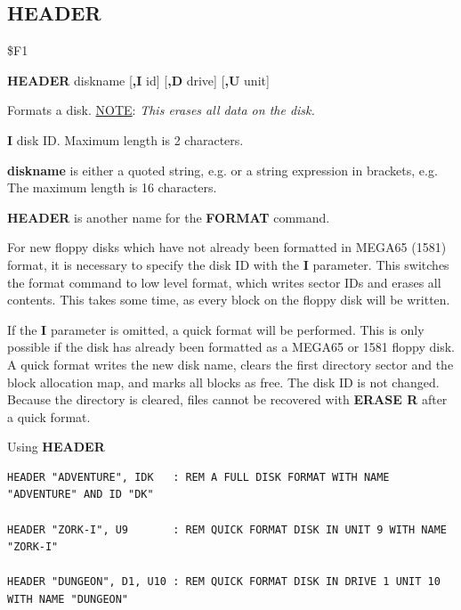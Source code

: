\subsection{HEADER}
\begin{description}[leftmargin=2cm,style=nextline]
\item [Token:]    \$F1

\item [Format:]   {\bf HEADER} diskname [{\bf,I} id] [{\bf,D} drive] [{\bf,U} unit]

\item [Usage:]    Formats a disk. \underline{NOTE}: {\em This erases all data on the disk.}

                  {\bf I} disk ID. Maximum length is 2 characters.

                  {\bf diskname} is either a quoted string, e.g.  or a string expression in brackets, e.g.  The maximum length is 16 characters.

                  \drivedefinition

                  \unitdefinition

\item [Remarks:]  {\bf HEADER} is another name for the {\bf FORMAT} command.

                  For new floppy disks which have not already been formatted in MEGA65 (1581) format, it is necessary to specify the disk ID with the {\bf I} parameter. This switches the format command to low level format, which writes sector IDs and erases all contents. This takes some time, as every block on the floppy disk will be written.

                  If the {\bf I} parameter is omitted, a quick format will be performed. This is only possible if the disk has already been formatted as a MEGA65 or 1581 floppy disk. A quick format writes the new disk name, clears the first directory sector and the block allocation map, and marks all blocks as free. The disk ID is not changed. Because the directory is cleared, files cannot be recovered with {\bf ERASE R} after a quick format.

\item [Examples:] Using {\bf HEADER}

\begin{tcolorbox}[colback=black,coltext=white]
\verbatimfont{\codefont}
\begin{verbatim}
HEADER "ADVENTURE", IDK   : REM A FULL DISK FORMAT WITH NAME "ADVENTURE" AND ID "DK"

HEADER "ZORK-I", U9       : REM QUICK FORMAT DISK IN UNIT 9 WITH NAME "ZORK-I"

HEADER "DUNGEON", D1, U10 : REM QUICK FORMAT DISK IN DRIVE 1 UNIT 10 WITH NAME "DUNGEON"
\end{verbatim}
\end{tcolorbox}
\end{description}

